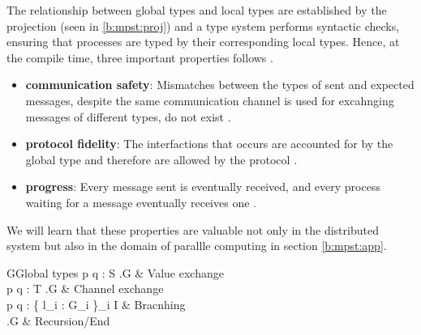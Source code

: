 The relationship between global types and local types are established by the projection (seen in \ref{b:mpst:proj}) and a type system performs syntactic checks, ensuring that processes are typed by their corresponding local types. Hence, at the compile time, three important properties follows \cite{coppoGentleIntroductionMultiparty2015}. 
\begin{itemize}
  \item \textbf{communication safety}: Mismatches between the types of sent and expected messages, despite the same communication channel is used for excahnging messages of different types, do not exist \cite{coppoGentleIntroductionMultiparty2015}. 
  \item \textbf{protocol fidelity}: The interfactions that occurs are accounted for by the global type and therefore are allowed by the protocol \cite{coppoGentleIntroductionMultiparty2015}.
  \item \textbf{progress}: Every message sent is eventually received, and every process waiting for a message eventually receives one \cite{coppoGentleIntroductionMultiparty2015}.
\end{itemize}
We will learn that these properties are valuable not only in the distributed system but also in the domain of parallle computing in section \ref{b:mpst:app}.
\begin{table}[ht]
\centering
\begin{grammar}{G\Coloneqq}{Global types}
  p \rightarrow q : \langle S \rangle.G & Value exchange \\
  p \rightarrow q : \langle T \rangle.G & Channel exchange \\
  p \rightarrow q : \{ l_i : G_i \}_{i \in I} & Bracnhing \\
  \mu {}.G  \mid {} \mid {} & Recursion/End
\end{grammar}
\caption{Global types} \label{b:mpst:gt}
\end{table}
